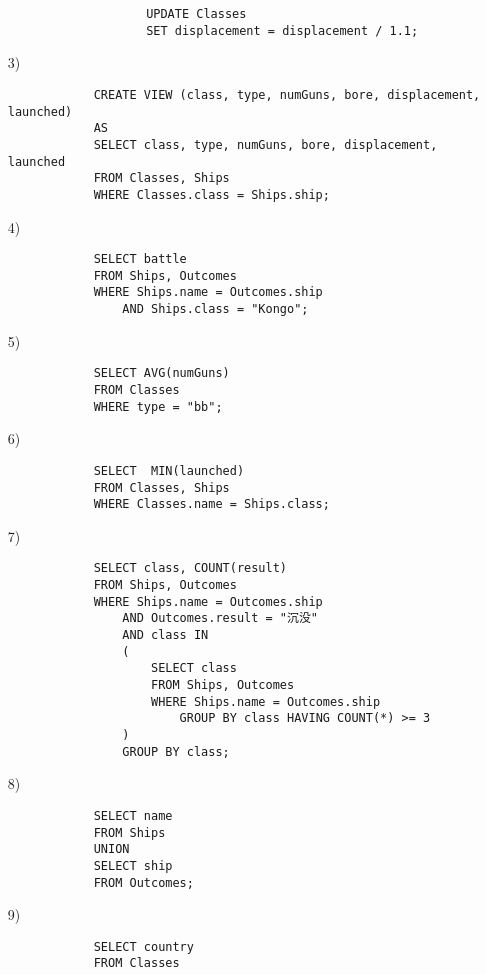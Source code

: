 \documentclass[10pt,a4paper]{article}
\begin{document}
\begin{enumerate}
\begin{itemize}
\begin{verbatim}
                UPDATE Classes
                SET displacement = displacement / 1.1;
            \end{verbatim}  
        \end{itemize}
        \item[3)]\begin{verbatim}
            CREATE VIEW (class, type, numGuns, bore, displacement, launched)
            AS
            SELECT class, type, numGuns, bore, displacement, launched
            FROM Classes, Ships
            WHERE Classes.class = Ships.ship;
        \end{verbatim}
        \item[4)]\begin{verbatim}
            SELECT battle
            FROM Ships, Outcomes
            WHERE Ships.name = Outcomes.ship
                AND Ships.class = "Kongo";
        \end{verbatim}
        \item[5)]\begin{verbatim}
            SELECT AVG(numGuns)
            FROM Classes
            WHERE type = "bb";
        \end{verbatim}
        \item[6)]\begin{verbatim}
            SELECT  MIN(launched)
            FROM Classes, Ships
            WHERE Classes.name = Ships.class;
        \end{verbatim}
        \item[7)]\begin{verbatim}
            SELECT class, COUNT(result)
            FROM Ships, Outcomes
            WHERE Ships.name = Outcomes.ship
                AND Outcomes.result = "沉没"
                AND class IN
                (
                    SELECT class
                    FROM Ships, Outcomes
                    WHERE Ships.name = Outcomes.ship
                        GROUP BY class HAVING COUNT(*) >= 3
                )
                GROUP BY class;
        \end{verbatim}
        \item[8)]\begin{verbatim}
            SELECT name
            FROM Ships
            UNION
            SELECT ship
            FROM Outcomes;
        \end{verbatim}
        \item[9)]\begin{verbatim}
            SELECT country
            FROM Classes

\end{verbatim}
\end{enumerate}
\end{document}
